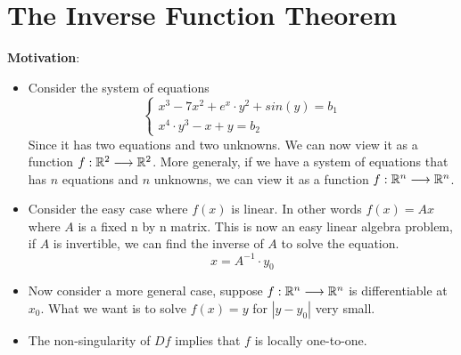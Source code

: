 \section{The Inverse Function Theorem}

\noindent \textbf{Motivation}:
\begin{itemize}
    \item Consider the system of equations 
    \begin{equation}
        \begin{cases}
            x^3-7x^2+e^x\cdot y^2+sin(y)=b_1\\
            x^4\cdot y^3-x+y=b_2
        \end{cases}
    \end{equation}
    Since it has two equations and two unknowns. 
    We can now view it as a function $f:\mathbb{R}^2\longrightarrow \mathbb{R}^2$. 
    More generaly, if we have a system of equations that has $n$ equations and $n$ unknowns, we can view it as a function $f:\mathbb{R}^n \longrightarrow \mathbb{R}^n$.
    \item Consider the easy case where $f(x)$ is linear. In other words $f(x)=Ax$ where $A$ is a fixed n by n matrix. This is now an easy linear algebra problem, if $A$ is invertible, we can find the inverse of $A$ to solve the equation. $$x=A^{-1}\cdot y_0$$
    \item Now consider a more general case, suppose $f:\mathbb{R}^n\longrightarrow\mathbb{R}^n$ is differentiable at $x_0$.  What we want is to solve $f(x)=y$ for $|y-y_0|$ very small.
    \item The non-singularity of $Df$ implies that $f$ is locally one-to-one.
\end{itemize}

